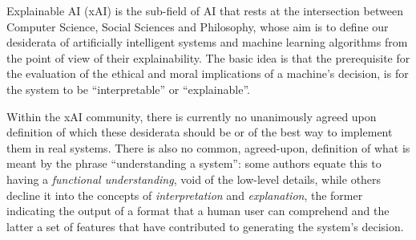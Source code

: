 \documentclass[mscthesis]{usiinfthesis}
\begin{document}
Explainable AI (xAI) is the sub-field of AI that rests at the intersection between Computer Science, Social Sciences and Philosophy, whose aim is to define our desiderata of artificially intelligent systems and machine learning algorithms from the point of view of their explainability.  The basic idea is that the prerequisite for the evaluation of the ethical and moral implications of a machine's decision, is for the system to be ``interpretable'' or ``explainable''.  

Within the xAI community, there is currently no unanimously agreed upon definition of which these desiderata should be or of the best way to implement them in real systems.
There is also no common, agreed-upon, definition of what is meant by the phrase ``understanding a system'': some authors equate this to having a \textit{functional understanding}, void of the low-level details, while others decline it into the concepts of \textit{interpretation} and \textit{explanation}, the former indicating the output of a format that a human user can comprehend and the latter a set of features that have contributed to generating the system's decision. 
\end{document}
